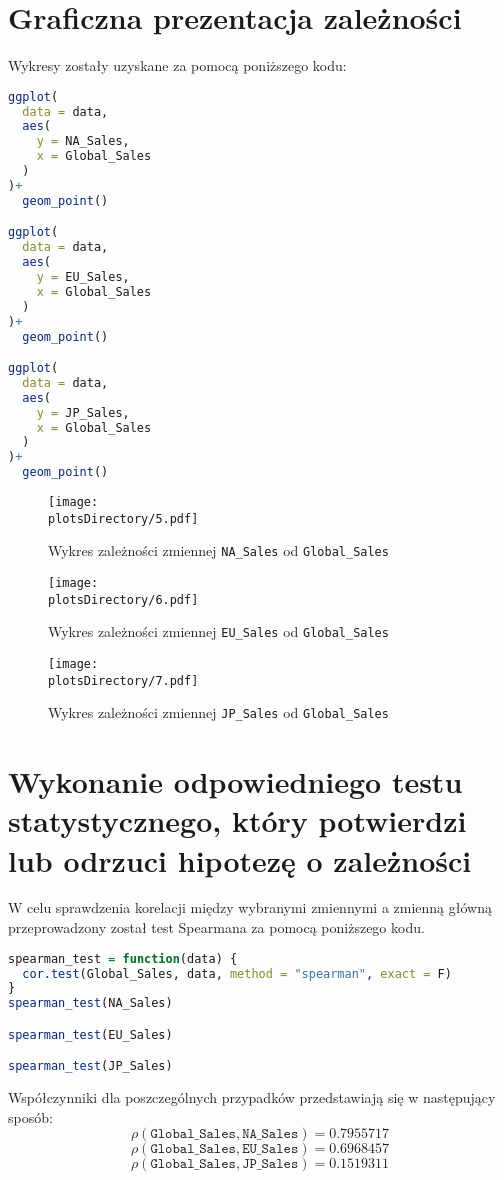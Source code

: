 	\section{Graficzna prezentacja zależności}
	Wykresy zostały uzyskane za pomocą poniższego kodu:
	\begin{lstlisting}[language=R]
ggplot(
  data = data,
  aes(
    y = NA_Sales,
    x = Global_Sales
  )
)+
  geom_point()

ggplot(
  data = data,
  aes(
    y = EU_Sales,
    x = Global_Sales
  )
)+
  geom_point()

ggplot(
  data = data,
  aes(
    y = JP_Sales,
    x = Global_Sales
  )
)+
  geom_point()
\end{lstlisting}
	\begin{center}
	\begin{figure}[H]
  	\texttt{[image: \\plotsDirectory/5.pdf]}
  	\caption{Wykres zależności zmiennej \texttt{NA\_Sales} od \texttt{Global\_Sales}}
	\end{figure}	
	\begin{figure}[H]
  	\texttt{[image: \\plotsDirectory/6.pdf]}
  	\caption{Wykres zależności zmiennej \texttt{EU\_Sales} od \texttt{Global\_Sales}}
	\end{figure}	
	\begin{figure}[H]
  	\texttt{[image: \\plotsDirectory/7.pdf]}
  	\caption{Wykres zależności zmiennej \texttt{JP\_Sales} od \texttt{Global\_Sales}}
	\end{figure}	
	\end{center}	
	
	\section{Wykonanie odpowiedniego testu statystycznego, który potwierdzi lub odrzuci hipotezę o zależności}
	
	W celu sprawdzenia korelacji między wybranymi zmiennymi a zmienną główną przeprowadzony został test Spearmana za pomocą poniższego kodu.
	\begin{lstlisting}[language=R]
spearman_test = function(data) {
  cor.test(Global_Sales, data, method = "spearman", exact = F)
}
spearman_test(NA_Sales)

spearman_test(EU_Sales)

spearman_test(JP_Sales)
\end{lstlisting}
Współczynniki dla poszczególnych przypadków przedstawiają się w następujący sposób:
$$\rho(\texttt{Global\_Sales},\texttt{NA\_Sales}) = 0.7955717$$
$$\rho(\texttt{Global\_Sales},\texttt{EU\_Sales}) = 0.6968457$$
$$\rho(\texttt{Global\_Sales},\texttt{JP\_Sales}) = 0.1519311$$
